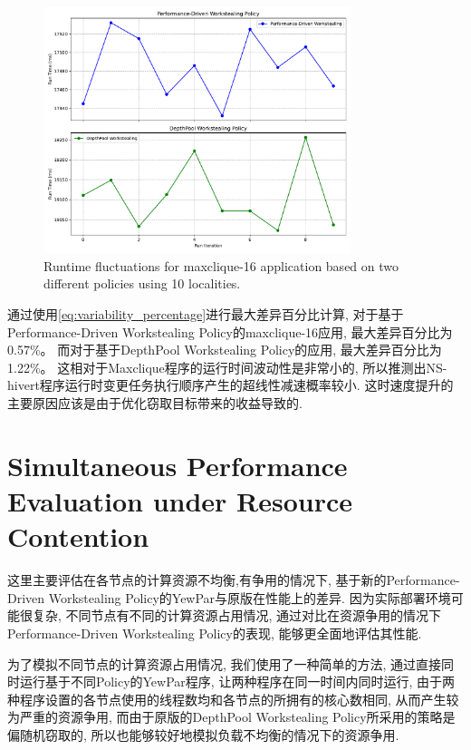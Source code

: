 \documentclass{mproj}
\begin{document}
\begin{figure}[h]
    \centering
    \includegraphics[width=0.8\textwidth]{images/NS_hivert_fluctuations.pdf}
    \caption{Runtime fluctuations for maxclique-16 application based on two different policies using 10 localities.}
    \label{fig:NS_hivert_fluctuations}
\end{figure}
\FloatBarrier

通过使用\cref{eq:variability_percentage}进行最大差异百分比计算,
对于基于Performance-Driven Workstealing Policy的maxclique-16应用,
最大差异百分比为0.57\%。
而对于基于DepthPool Workstealing Policy的应用,
最大差异百分比为1.22\%。
这相对于Maxclique程序的运行时间波动性是非常小的,
所以推测出NS-hivert程序运行时变更任务执行顺序产生的超线性减速概率较小.
这时速度提升的主要原因应该是由于优化窃取目标带来的收益导致的.


\section{Simultaneous Performance Evaluation under Resource Contention}

这里主要评估在各节点的计算资源不均衡,有争用的情况下,
基于新的Performance-Driven Workstealing Policy的YewPar与原版在性能上的差异.
因为实际部署环境可能很复杂,
不同节点有不同的计算资源占用情况,
通过对比在资源争用的情况下Performance-Driven Workstealing Policy的表现,
能够更全面地评估其性能.

为了模拟不同节点的计算资源占用情况,
我们使用了一种简单的方法,
通过直接同时运行基于不同Policy的YewPar程序,
让两种程序在同一时间内同时运行,
由于两种程序设置的各节点使用的线程数均和各节点的所拥有的核心数相同,
从而产生较为严重的资源争用,
而由于原版的DepthPool Workstealing Policy所采用的策略是偏随机窃取的,
所以也能够较好地模拟负载不均衡的情况下的资源争用.
\end{document}
